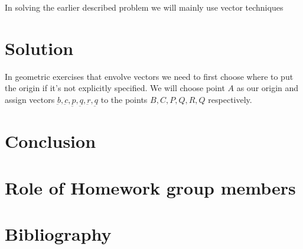 \documentclass{article}
\theoremstyle{mytheoremstyle}
\theoremstyle{mytheoremstyle}
\theoremstyle{myproblemstyle}
\begin{document}
    In solving the earlier described problem we will mainly use vector techniques

    \section{Solution}
    In geometric exercises that envolve vectors we need to first choose where to put the origin
    if it's not explicitly specified. We will choose point $A$ as our origin and assign vectors
    $\underbar{b}, \underbar{c}, \underbar{p}, \underbar{q}, \underbar{r}, \underbar{q}$ to the points
    $B, C, P, Q, R, Q$ respectively.







    \section{Conclusion}

    \section{Role of Homework group members}

    \section{Bibliography}
\end{document}
